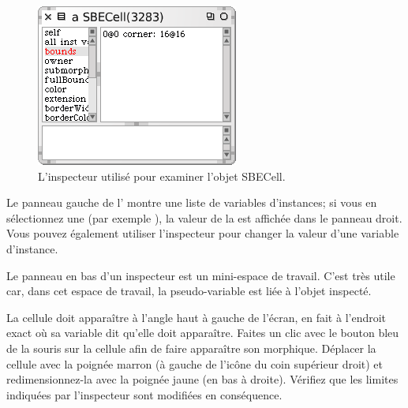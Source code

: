 \documentclass[a4paper,10pt,twoside]{book}
\begin{document}

\begin{figure}[htbp]
   \centering
   \includegraphics[scale=0.7]{SBECellInspector} 
   \caption{L'inspecteur utilisé pour examiner l'objet SBECell.\label{fig:SBECellInspector}}
\end{figure}

Le panneau gauche de l' montre une liste de variables d'instances; si vous en sélectionnez une (par exemple \mbox{),} la valeur de la  est affichée dans le panneau droit. Vous pouvez également utiliser l'inspecteur pour changer la valeur d'une variable d'instance.


Le panneau en bas d'un inspecteur est un mini-espace de travail. C'est très utile car, dans cet espace de travail, la pseudo-variable \self est liée à l'objet inspecté.

La cellule doit apparaître à l'angle haut à gauche de l'écran, en fait à l'endroit exact où sa variable  dit qu'elle doit apparaître.
Faites un clic avec le bouton bleu de la souris sur la cellule afin de faire apparaître son  morphique.
Déplacer la cellule avec la poignée marron (à 
gauche de l'ic\^one du coin sup\'erieur droit) et redimensionnez-la avec la poignée jaune (en bas à droite).
Vérifiez que les limites indiquées par l'inspecteur sont modifiées en conséquence.
\end{document}
